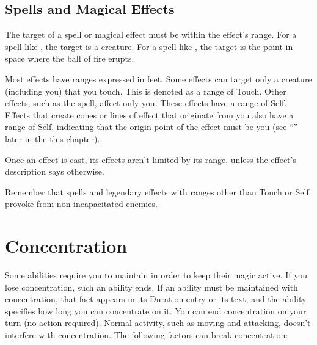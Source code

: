 \subsection{Spells and Magical Effects}\label{subsec:magic-range}

The target of a spell or magical effect must be within the effect's range. For a spell like , the target is a creature. For a spell like , the target is the point in space where the ball of fire erupts.

Most effects have ranges expressed in feet. Some effects can target only a creature (including you) that you touch. This is denoted as a range of Touch. Other effects, such as the  spell, affect only you. These effects have a range of Self. Effects that create cones or lines of effect that originate from you also have a range of Self, indicating that the origin point of the effect must be you (see “” later in the this chapter).

Once an effect is cast, its effects aren't limited by its range, unless the effect's description says otherwise.

Remember that spells and legendary effects with ranges other than Touch or Self provoke  from non-incapacitated enemies.

\section{Concentration \label{sec:concentration}}
Some abilities require you to maintain  in order to keep their magic active. If you lose concentration, such an ability ends. If an ability must be maintained with concentration, that fact appears in its Duration entry or its text, and the ability specifies how long you can concentrate on it. You can end concentration on your turn (no action required). Normal activity, such as moving and attacking, doesn't interfere with concentration. The following factors can break concentration:

